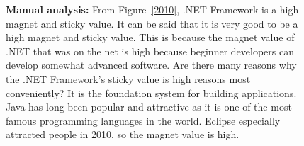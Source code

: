 \documentclass[conference]{IEEEtran}
\begin{document}
\begin{figure}[t]

\medskip



\textbf{Manual analysis:}
From Figure~\ref{2010}, .NET Framework is a high magnet and sticky value. It can be said that it is very good to be a high magnet and sticky value. This is because the magnet value of .NET that was on the net is high because beginner developers can develop somewhat advanced software. Are there many reasons why the .NET Framework's sticky value is high reasons most conveniently? It is the foundation system for building applications. Java has long been popular and attractive as it is one of the most famous programming languages ​​in the world. Eclipse especially attracted people in 2010, so the magnet value is high.
\medskip


\end{figure}
\end{document}
